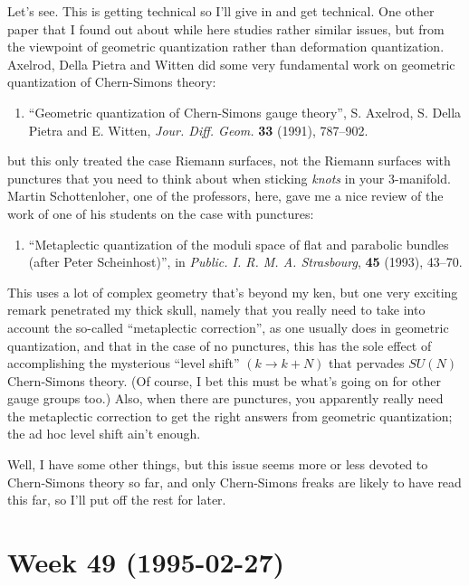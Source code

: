 \documentclass{article}
\def\tightlist{}
\begin{document}
Let's see. This is getting technical so I'll give in and get technical.
One other paper that I found out about while here studies rather similar
issues, but from the viewpoint of geometric quantization rather than
deformation quantization. Axelrod, Della Pietra and Witten did some very
fundamental work on geometric quantization of Chern-Simons theory:

\begin{enumerate}
\def\labelenumi{\arabic{enumi})}
\setcounter{enumi}{5}
\tightlist
\item
  ``Geometric quantization of Chern-Simons gauge theory'', S. Axelrod,
  S. Della Pietra and E. Witten, \emph{Jour. Diff. Geom.} \textbf{33}
  (1991), 787--902.
\end{enumerate}

but this only treated the case Riemann surfaces, not the Riemann
surfaces with punctures that you need to think about when sticking
\emph{knots} in your 3-manifold. Martin Schottenloher, one of the
professors, here, gave me a nice review of the work of one of his
students on the case with punctures:

\begin{enumerate}
\def\labelenumi{\arabic{enumi})}
\setcounter{enumi}{6}
\tightlist
\item
  ``Metaplectic quantization of the moduli space of flat and parabolic
  bundles (after Peter Scheinhost)'', in \emph{Public. I. R. M. A.
  Strasbourg}, \textbf{45} (1993), 43--70.
\end{enumerate}

This uses a lot of complex geometry that's beyond my ken, but one very
exciting remark penetrated my thick skull, namely that you really need
to take into account the so-called ``metaplectic correction'', as one
usually does in geometric quantization, and that in the case of no
punctures, this has the sole effect of accomplishing the mysterious
``level shift'' \((k \to k + N)\) that pervades \(SU(N)\) Chern-Simons
theory. (Of course, I bet this must be what's going on for other gauge
groups too.) Also, when there are punctures, you apparently really need
the metaplectic correction to get the right answers from geometric
quantization; the ad hoc level shift ain't enough.

Well, I have some other things, but this issue seems more or less
devoted to Chern-Simons theory so far, and only Chern-Simons freaks are
likely to have read this far, so I'll put off the rest for later.
\hypertarget{week-49-1995-02-27}{%
\section{Week 49 (1995-02-27)}\label{week-49-1995-02-27}}
\end{document}
